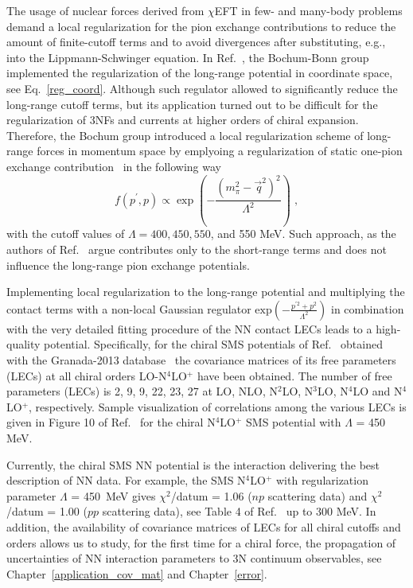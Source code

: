 The usage of nuclear forces derived from $\chi$EFT in few- and many-body problems demand a local regularization for the pion exchange contributions to reduce the amount of finite-cutoff terms and to avoid divergences after substituting, e.g., into the Lippmann-Schwinger equation. In Ref.~\cite{Epelbaum2015}, the Bochum-Bonn group implemented the regularization of the long-range potential in coordinate space, see Eq.~\ref{reg_coord}. Although such regulator allowed to significantly reduce the long-range cutoff terms, but its application turned out to be difficult for the regularization of 3NFs and currents at higher orders of chiral expansion. 
Therefore, the Bochum group introduced a local regularization scheme of long-range forces in momentum space by emplyoing a regularization of static one-pion exchange contribution~\cite{Reinert2018} in the following way
\begin{equation}
f(p^{\prime}, p) \propto \exp\left(-\frac{\left(m^{2}_{\pi} - \!\vec{\,q}^{2}\right)^{2}}{\Lambda^{2}}\right)\;,
\end{equation}
with the cutoff values of $\Lambda = 400, 450, 550$, and 550 MeV. Such approach, as the authors of Ref.~\cite{Reinert2018} argue contributes only to the short-range terms and does not influence the long-range pion exchange potentials.

Implementing local regularization to the long-range potential and multiplying the contact terms with a non-local Gaussian regulator $\mathrm{exp}\left(-\frac{p^{\prime 2} + p^{2}}{\Lambda^{2}}\right)$ in combination with the very detailed fitting procedure of the NN contact LECs leads to a high-quality potential. Specifically, for the chiral SMS potentials of Ref.~\cite{Reinert2018} obtained with the Granada-2013 database~\cite{NavarroPerez2014} the covariance matrices of its free parameters (LECs) at all chiral orders LO-N$^{4}$LO$^{+}$ have been obtained. The number of free parameters (LECs) is 2, 9, 9, 22, 23, 27 at LO, NLO, N$^{2}$LO, N$^{3}$LO, N$^{4}$LO and N$^{4}$LO$^{+}$, respectively. 
Sample visualization of correlations among the various LECs is given in Figure 10 of Ref.~\cite{Reinert2018} for the chiral N$^{4}$LO$^{+}$ SMS potential with $\Lambda$ = 450 MeV. 

Currently, the chiral SMS NN potential is the interaction delivering the best description of NN data. For example, the SMS N$^{4}$LO$^{+}$ with regularization parameter $\Lambda$ = 450~MeV gives $\chi^{2}$/datum = 1.06 ($np$ scattering data) and $\chi^{2}$/datum = 1.00 ($pp$ scattering data), see Table 4 of Ref.~\cite{Reinert2018} up to 300 MeV. In addition, the availability of covariance matrices of LECs for all chiral cutoffs and orders allows us to study, for the first time for a chiral force, the propagation of uncertainties of NN interaction parameters to 3N continuum observables, see Chapter~\ref{application_cov_mat} and Chapter~\ref{error}. 



